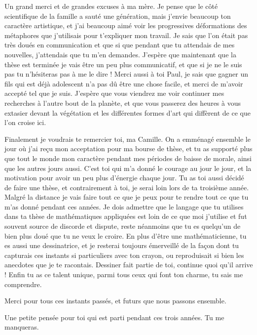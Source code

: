 \documentclass[A4paperpaper,11pt,english]{sphinxmanual}
\begin{document}
Un grand merci et de grandes excuses à ma mère. Je pense que le côté scientifique
de la famille a sauté une génération, mais j'envie beaucoup ton caractère
artistique, et j'ai beaucoup aimé voir les progressives déformations des
métaphores que j'utilisais pour t'expliquer mon travail. Je sais que l'on était
pas très doués en communication et que si que pendant que tu attendais de mes
nouvelles, j'attendais que tu m'en demandes. J'espère que maintenant que la
thèse est terminée je vais être un peu plus communicatif, et que si je ne le
suis pas tu n'hésiteras pas à me le dire ! Merci aussi à toi Paul, je sais que
gagner un fils qui est déjà adolescent n'a pas dû être une chose facile, et
merci de m'avoir accepté tel que je suis. J'espère que vous viendrez me voir
continuer mes recherches à l'autre bout de la planète, et que vous passerez des
heures à vous extasier devant la végétation et les différentes formes d'art qui
diffèrent de ce que l'on croise ici.

Finalement je voudrais te remercier toi, ma Camille. On a emménagé ensemble le
jour où j'ai reçu mon acceptation pour ma bourse de thèse, et tu as supporté
plus que tout le monde mon caractère pendant mes périodes de baisse de morale,
ainsi que les autres jours aussi. C'est toi qui m'a donné le courage au jour
le jour, et la motivation pour avoir un peu plus d'énergie chaque jour. Tu as
toi aussi décidé de faire une thèse, et contrairement à toi, je serai loin lors
de ta troisième année. Malgré la distance je vais faire tout ce que je peux
pour te rendre tout ce que tu m'as donné pendant ces années. Je dois admettre
que le langage que tu utilises dans ta thèse de mathématiques appliquées est loin
de ce que moi j'utilise et fut souvent source de discorde et dispute, reste
néanmoins que tu es quelqu'un de bien plus doué que tu ne veux le croire.  En
plus d'être une mathématicienne, tu es aussi une dessinatrice, et je resterai
toujours émerveillé de la façon dont tu capturais ces instants si particuliers
avec ton crayon, ou reproduisait si bien les anecdotes que je te racontais.
Dessiner fait partie de toi, continue quoi qu'il arrive !  Enfin tu as ce
talent unique, parmi tous ceux qui font ton charme, tu sais me comprendre.

Merci pour tous ces instants passés, et futurs que nous passons ensemble.

Une petite pensée pour toi qui est parti pendant ces trois années. Tu me manqueras.



\tableofcontents
\cleardoublepage
\end{document}
